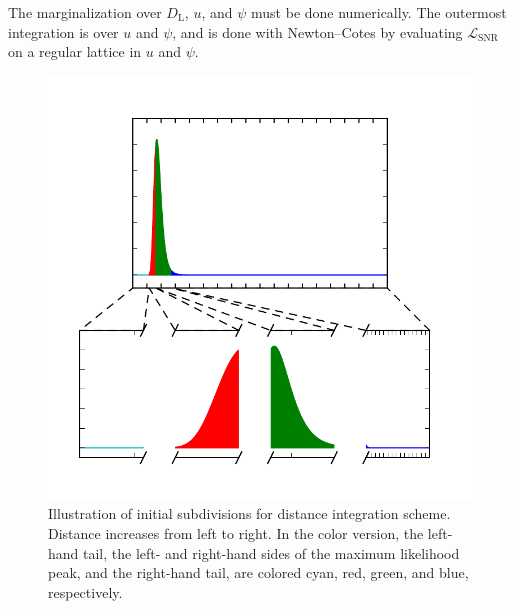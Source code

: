 \documentclass{iopart}
\begin{document}
The marginalization over $D_\mathrm{L}$, $u$, and $\psi$ must be done numerically. The outermost integration is over $u$ and $\psi$, and is done with Newton\nobreakdashes--Cotes by evaluating $\mathcal{L}_\mathrm{SNR}$ on a regular lattice in $u$ and $\psi$.

\begin{figure}
    \caption{\label{fig:radial_integrand}Illustration of initial subdivisions for distance integration scheme. Distance increases from left to right. In the color version, the left\nobreakdashes-hand tail, the left\nobreakdashes- and right\nobreakdashes-hand sides of the maximum likelihood peak, and the right\nobreakdashes-hand tail, are colored cyan, red, green, and blue, respectively.}
    \begin{center}
        \includegraphics{radial_integrand}
    \end{center}
\end{figure}
\end{document}
